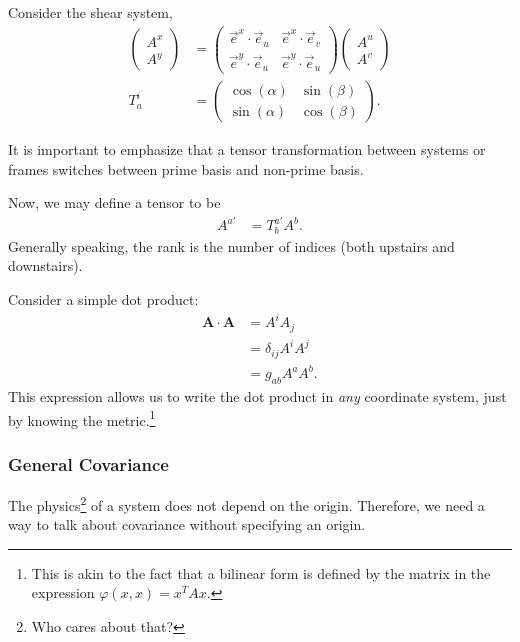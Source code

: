 \documentclass[10pt]{mypackage}
\begin{document}
  \begin{example}
    Consider the shear system,
    \begin{align*}
      \begin{pmatrix}A^{x}\\A^{y}\end{pmatrix} &= \begin{pmatrix}\vec{e}^{x}\cdot \vec{e}_{u} & \vec{e}^{x}\cdot\vec{e}_{v} \\ \vec{e}^{y}\cdot \vec{e}_{u} & \vec{e}^{y}\cdot \vec{e}_{u}\end{pmatrix} \begin{pmatrix}A^{u}\\A^{v}\end{pmatrix}\\
      T_{a}^{i} &= \begin{pmatrix}\cos\left( \alpha \right) & \sin\left( \beta \right)\\ \sin\left( \alpha \right) & \cos\left( \beta \right)\end{pmatrix}.
    \end{align*}
  \end{example}
  It is important to emphasize that a tensor transformation between systems or frames switches between prime basis and non-prime basis.\newline

  Now, we may define a tensor to be
  \begin{align*}
    A^{a'} &= T_{b}^{a'}A^{b}.
  \end{align*}
  Generally speaking, the rank is the number of indices (both upstairs and downstairs).\newline

  Consider a simple dot product:
  \begin{align*}
    \mathbf{A}\cdot \mathbf{A} &= A^iA_j\\
                               &= \delta_{ij}A^iA^j\\
                               &= g_{ab}A^{a}A^{b}.
  \end{align*}
  This expression allows us to write the dot product in \textit{any} coordinate system, just by knowing the metric.\footnote{This is akin to the fact that a bilinear form is defined by the matrix in the expression $ \varphi\left( x,x \right) = x^{T}Ax $.}
  \subsubsection{General Covariance}%
  The physics\footnote{Who cares about that?} of a system does not depend on the origin. Therefore, we need a way to talk about covariance without specifying an origin.\newline
\end{document}
